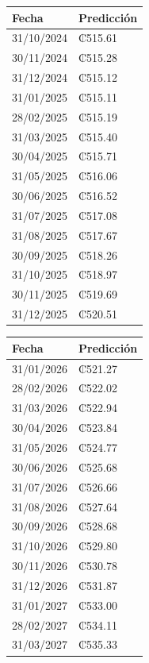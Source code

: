 \documentclass[12pt]{article}
\begin{document}
\begin{paracol}{2} %

\begin{tabular}{ll}
  \toprule
Fecha & Predicción \\ 
  \midrule
31/10/2024 & ₡515.61 \\ 
30/11/2024 & ₡515.28 \\ 
31/12/2024 & ₡515.12 \\ 
31/01/2025 & ₡515.11 \\ 
28/02/2025 & ₡515.19 \\ 
31/03/2025 & ₡515.40 \\ 
30/04/2025 & ₡515.71 \\ 
31/05/2025 & ₡516.06 \\ 
30/06/2025 & ₡516.52 \\ 
31/07/2025 & ₡517.08 \\ 
31/08/2025 & ₡517.67 \\ 
30/09/2025 & ₡518.26 \\ 
31/10/2025 & ₡518.97 \\ 
30/11/2025 & ₡519.69 \\ 
31/12/2025 & ₡520.51 \\ 
  \bottomrule
\end{tabular}

\switchcolumn %

\begin{tabular}{ll}
  \toprule
Fecha & Predicción \\ 
  \midrule
31/01/2026 & ₡521.27 \\ 
28/02/2026 & ₡522.02 \\ 
31/03/2026 & ₡522.94 \\ 
30/04/2026 & ₡523.84 \\ 
31/05/2026 & ₡524.77 \\ 
30/06/2026 & ₡525.68 \\ 
31/07/2026 & ₡526.66 \\ 
31/08/2026 & ₡527.64 \\ 
30/09/2026 & ₡528.68 \\ 
31/10/2026 & ₡529.80 \\ 
30/11/2026 & ₡530.78 \\ 
31/12/2026 & ₡531.87 \\ 
31/01/2027 & ₡533.00 \\ 
28/02/2027 & ₡534.11 \\ 
31/03/2027 & ₡535.33 \\ 
  \bottomrule
\end{tabular}

\end{paracol}
\end{document}
